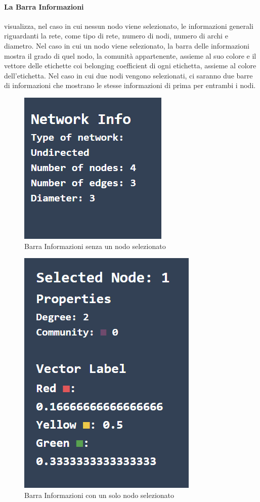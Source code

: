 \documentclass[a4paper,12pt]{report}
\begin{document}
			\paragraph*{La Barra Informazioni} visualizza, nel caso in cui nessun nodo viene selezionato, le informazioni generali riguardanti la rete, come tipo di rete, numero di nodi, numero di archi e diametro. Nel caso in cui un nodo viene selezionato, la barra delle informazioni mostra il grado di quel nodo, la comunità appartenente, assieme al suo colore e il vettore delle etichette coi belonging coefficient di ogni etichetta, assieme al colore dell'etichetta. Nel caso in cui due nodi vengono selezionati, ci saranno due barre di informazioni che mostrano le stesse informazioni di prima per entrambi i nodi. 

			\begin{center}
				\begin{figure}[H]
				\centering
				\includegraphics[width=0.4\linewidth]{infobargeneral}
				\caption{Barra Informazioni senza un nodo selezionato}
				\end{figure}
				\begin{figure}[H]
				\centering
				\includegraphics[width=0.4\linewidth]{infobar1}
				\caption{Barra Informazioni con un solo nodo selezionato}
				\end{figure}

\end{center}
\end{document}
